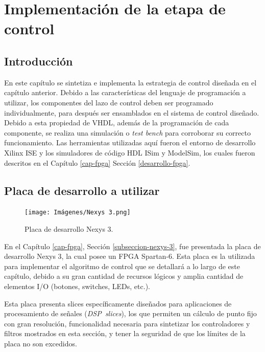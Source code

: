 \chapter{Implementación de la etapa de control}
\label{implementacion-control}

\section{Introducción}

En este capítulo se sintetiza e implementa la estrategia de control diseñada en el capítulo anterior. Debido a las características del lenguaje de programación a utilizar, los componentes del lazo de control deben ser programado individualmente, para después ser ensamblados en el sistema de control diseñado. Debido a esta propiedad de VHDL, además de la programación de cada componente, se realiza una simulación o \emph{test bench} para corroborar su correcto funcionamiento. Las herramientas utilizadas aquí fueron el entorno de desarrollo Xilinx ISE y los simuladores de código HDL ISim y ModelSim, los cuales fueron descritos en el Capítulo \ref{cap-fpga} Sección \ref{desarrollo-fpga}.

\section{Placa de desarrollo a utilizar}

\begin{figure}
    \vspace{-10pt}
    \begin{center}
      \texttt{[image: Imágenes/Nexys 3.png]}
    \end{center}
    \caption{Placa de desarrollo Nexys 3.}
    \label{nexys3}
  \end{figure}

En el Capítulo \ref{cap-fpga}, Sección \ref{subseccion-nexys-3}, fue presentada la placa de desarrollo Nexys 3, la cual posee un FPGA Spartan-6. Esta placa es la utilizada para implementar el algoritmo de control que se detallará a lo largo de este capítulo, debido a su gran cantidad de recursos lógicos y amplia cantidad de elementos I/O (botones, switches, LEDs, etc.).

Esta placa presenta slices específicamente diseñados para aplicaciones de procesamiento de señales (\mbox{\emph{DSP slices}}), los que permiten un cálculo de punto fijo con gran resolución, funcionalidad necesaria para sintetizar los controladores y filtros mostrados en esta sección, y tener la seguridad de que los límites de la placa no son excedidos.

